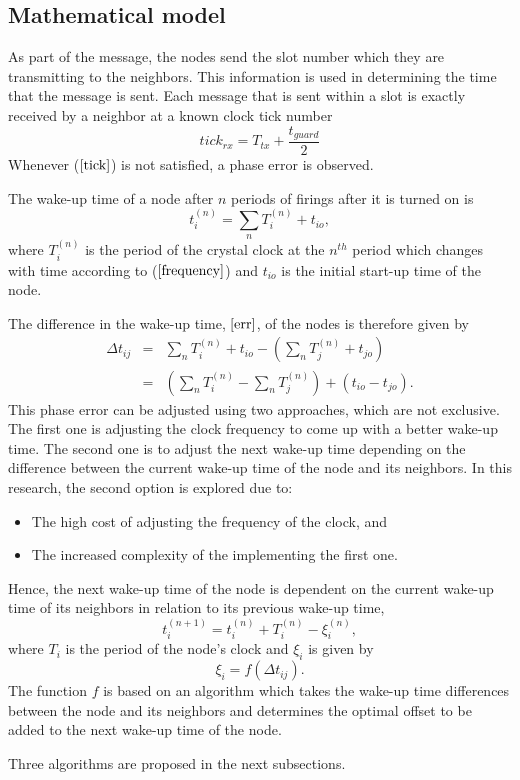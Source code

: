 \documentclass[journal]{IEEEtran}
\begin{document}
\subsection{\textbf{Mathematical model}}
As part of the message, the nodes send the slot number which they
are transmitting to the neighbors. This information is used in
determining the time that the message is sent. Each message that is
sent within a slot is exactly received by a neighbor at a known
clock tick number
\begin{equation}
tick_{rx} = T_{tx}+ \frac{t_{guard}}{2} \label{tick}
\end{equation}
Whenever ($\ref{tick}$) is not satisfied, a phase error is observed. \par
The wake-up time of a node after $n$ periods of firings after it is turned on is
\begin{equation}
t_i^{(n)} = \sum_{n} T_i^{(n)} + t_{io},
\end{equation}
where  $T_i^{(n)}$ is the period of the crystal clock at the $n^{th}$ period which changes with time according to ($\ref{frequency}$) and $t_{io}$ is the initial start-up time of the node.\par
The difference in the wake-up time, $\ref{err}$, of the nodes is therefore given by
\begin{eqnarray}
\Delta t_{ij} & = & \sum_{n}T_i^{(n)} + t_{io}- (\sum_{n}T_j^{(n)} +
t_{jo}) \\ &=& (\sum_{n}T_i^{(n)} - \sum_{n}T_j^{(n)}) +
(t_{io}-t_{jo}).
\end{eqnarray}
This phase error can be adjusted using two approaches, which are not exclusive. The first
one is adjusting the clock frequency to come up with a better
wake-up time. The second one is to adjust the next wake-up time
depending on the difference between the current wake-up time of the
node and its neighbors. In this research, the second option is
explored due to:
\begin{itemize}
\item The high cost of adjusting the frequency of the clock, and
\item The increased complexity of the implementing the first one.
\end{itemize}
Hence, the next wake-up time of the node is
dependent on the current wake-up time of its neighbors in relation
to its previous wake-up time,
\begin{equation}
t_i^{(n+1)} = t_i^{(n)} + T_i^{(n)} - \xi_i^{(n)} ,
\end{equation}
where $T_i$ is the period of the node's clock and $\xi_i$ is given
by
\begin{equation}
\xi_i = f(\Delta t_{ij}).
\end{equation}
The function $f$ is based on an algorithm which takes the wake-up
time differences between the node and its neighbors and determines
the optimal offset to be added to the next wake-up time of the node.
\par Three algorithms are proposed in the next subsections.
\end{document}
